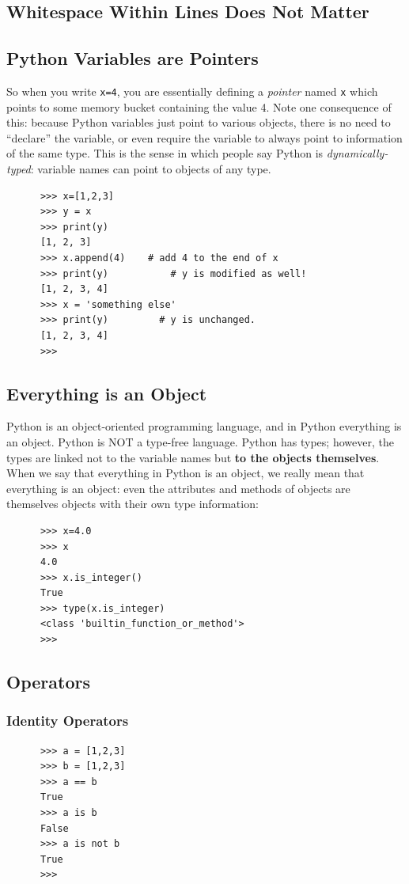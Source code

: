 \documentclass[11pt,a4paper]{article}
\begin{document}
    \subsection*{Whitespace Within Lines Does Not Matter}

    \subsection*{Python Variables are Pointers}
    So when you write {\tt x=4}, you are essentially defining a {\it pointer} named {\tt x} which points to some memory bucket containing the value 4. Note one consequence of this: because Python variables just point to various objects, there is no need to ``declare'' the variable, or even require the variable to always point to information of the same type.  This is the sense in which people say Python is {\it dynamically-typed}: variable names can point to objects of any type.
    \begin{lstlisting}
      >>> x=[1,2,3]
      >>> y = x
      >>> print(y)
      [1, 2, 3]
      >>> x.append(4)    # add 4 to the end of x
      >>> print(y)           # y is modified as well!
      [1, 2, 3, 4]
      >>> x = 'something else'
      >>> print(y)         # y is unchanged. 
      [1, 2, 3, 4]
      >>> 
    \end{lstlisting}


    \subsection*{Everything is an Object}
    Python is an object-oriented programming language, and in Python
    everything is an object. Python is NOT a type-free language. Python
    has types; however, the types are linked not to the variable names but
    {\bf to the objects themselves}. When we say that everything in Python
    is an object, we really mean that everything is an object: even the
    attributes and methods of objects are themselves objects with their
    own type information:
    \begin{lstlisting}
      >>> x=4.0
      >>> x
      4.0
      >>> x.is_integer()
      True
      >>> type(x.is_integer)
      <class 'builtin_function_or_method'>
      >>> 
    \end{lstlisting}


    \subsection*{Operators}
    \subsubsection*{Identity Operators}
    \begin{lstlisting}
      >>> a = [1,2,3]
      >>> b = [1,2,3]
      >>> a == b
      True
      >>> a is b
      False
      >>> a is not b
      True
      >>> 
   \end{lstlisting}
\end{document}
